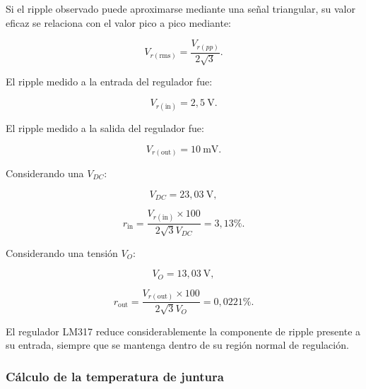 \documentclass[12pt,a4paper]{article}
\begin{document}
	Si el ripple observado puede aproximarse mediante una señal triangular, su valor
	eficaz se relaciona con el valor pico a pico mediante:
	
	\begin{equation}
		V_{r(\mathrm{rms})}
		=
		\frac{
			V_{r(pp)}
		}{
			2\sqrt{3}
		}.
	\end{equation}

    El ripple medido a la entrada del regulador fue:
    
    \begin{equation}
		V_{r(\text{in})}
		=
		2,5~\text{V}.
	\end{equation}

    El ripple medido a la salida del regulador fue:
	
	\begin{equation}
		V_{r(\text{out})}
		=
		10~\text{mV}.
	\end{equation}
	
	Considerando una $V_{DC}$:
	
	\begin{equation}
		V_{DC}
		=
		23,03~\text{V},
	\end{equation}
	
	\begin{equation}
		r_{\text{in}}
		=
		\frac{
			V_{r(\text{in})} \times 100
		}{
			2\sqrt{3}V_{DC}
		}
		=
		3,13\%.
	\end{equation}

    Considerando una tensión $V_O$:
	
	\begin{equation}
		V_{O}
		=
		13,03~\text{V},
	\end{equation}

    \begin{equation}
		r_{\text{out}}
		=
		\frac{
			V_{r(\text{out})} \times 100
		}{
			2\sqrt{3}V_{O}
		}
		=
		0,0221\%.
	\end{equation}

	El regulador LM317 reduce considerablemente la componente de ripple presente a su
	entrada, siempre que se mantenga dentro de su región normal de regulación.
	
	\subsubsection{Cálculo de la temperatura de juntura}
	
\end{document}
